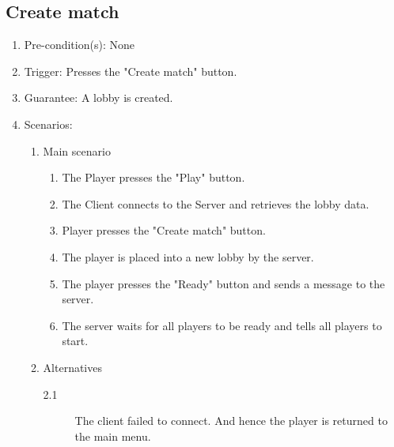 \documentclass[a4paper,twoside,11pt]{article}
\begin{document}
\subsection*{Create match}
\begin{enumerate}
\item Pre-condition(s): None
\item Trigger: Presses the "Create match" button.
\item Guarantee: A lobby is created.
\item Scenarios: 
	\begin{enumerate}
	\item Main scenario
		\begin{enumerate}[1)]		
		\item The Player presses the "Play" button.
		\item The Client connects to the Server and retrieves the lobby data.
		\item Player presses the "Create match" button.
		\item The player is placed into a new lobby by the server.
		\item The player presses the "Ready" button and sends a message to the server.
		\item The server waits for all players to be ready and tells all players to start.
		\end{enumerate}
	\item Alternatives
		\begin{description}
		\item[2.1] The client failed to connect. And hence the player is returned to the main menu.
		\end{description}
	\end{enumerate}
\end{enumerate}
\end{document}

